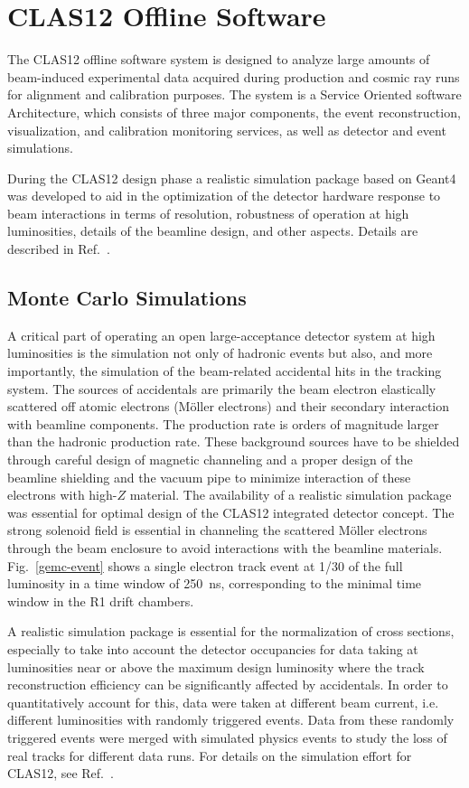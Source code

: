 \documentclass[final,3p,times,twocolumn,authoryear]{elsarticle}
\begin{document}
\section{CLAS12 Offline Software}  

The CLAS12 offline software system is designed to analyze large amounts of beam-induced experimental data acquired
during production and cosmic ray runs for alignment and calibration purposes. The system is a Service Oriented software
Architecture, which consists of three major components, the event reconstruction, visualization, and calibration monitoring
services, as well as detector and event simulations.  

During the CLAS12 design phase a realistic simulation package based on Geant4 was developed to aid in the optimization 
of the detector hardware response to beam interactions in terms of resolution, robustness of operation at high luminosities,
details of the beamline design, and other aspects. Details are described in Ref.~\cite{Software}. 

\subsection{Monte Carlo Simulations}

A critical part of operating an open large-acceptance detector system at high luminosities is the simulation not only of hadronic
events but also, and more importantly, the simulation of the beam-related accidental hits in the tracking system. The sources
of accidentals are primarily the beam electron elastically scattered off atomic electrons (M{\"o}ller electrons) and their
secondary interaction with beamline components. The production rate is orders of magnitude larger than the hadronic production
rate. These background sources have to be shielded through careful design of magnetic channeling and a proper design of the
beamline shielding and the vacuum pipe to minimize interaction of these electrons with high-$Z$ material. The availability of a
realistic simulation package was essential for optimal design of the CLAS12 integrated detector concept. The strong solenoid
field is essential in channeling the scattered M{\"o}ller electrons through the beam enclosure to avoid interactions with the 
beamline materials. Fig.~\ref{gemc-event}  shows a single electron track event at 1/30 of the full luminosity in a time window
of 250~ns, corresponding to the minimal time  window in the R1 drift chambers. 
 
A realistic simulation package is essential for the normalization of cross sections, especially to take into account the 
detector occupancies for data taking at luminosities near or above the maximum design luminosity where the track 
reconstruction efficiency can be significantly affected by accidentals. In order to quantitatively account for this, data
were taken at different beam current, i.e. different luminosities with randomly triggered events. Data from these randomly
triggered events were merged with simulated physics events to study the loss of real tracks for different data runs. For
details on the simulation effort for CLAS12, see Ref.~\cite{GEMC}.    
\end{document}
